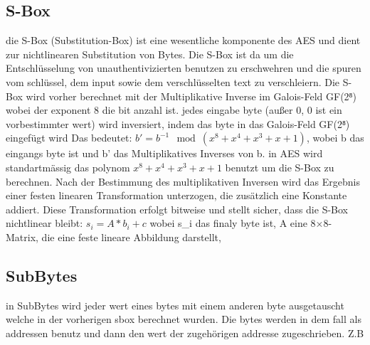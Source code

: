 \subsection{S-Box}
die S-Box (Substitution-Box) ist eine wesentliche komponente des AES und dient zur nichtlinearen Substitution von Bytes. 
Die S-Box ist da um die Entschlüsselung von unauthentivizierten benutzen zu erschwehren und die spuren vom schlüssel, dem 
input sowie dem verschlüsselten text zu verschleiern. Die S-Box wird vorher berechnet mit der Multiplikative Inverse im Galois-Feld GF(2⁸) 
wobei der exponent 8 die bit anzahl ist. jedes eingabe byte (außer 0, 0 ist ein vorbestimmter wert) wird inversiert, indem das byte in das Galois-Feld GF(2⁸) eingefügt wird 
Das bedeutet: $b' = b^{-1} \mod (x^8 + x^4 + x^3 + x + 1)$, wobei b das eingangs byte ist und b' das Multiplikatives Inverses von b. in AES wird standartmässig 
das polynom $x^8 + x^4 + x^3 + x + 1$ benutzt um die S-Box zu berechnen. Nach der Bestimmung des multiplikativen Inversen wird das 
Ergebnis einer festen linearen Transformation unterzogen, die zusätzlich eine Konstante addiert. Diese Transformation erfolgt bitweise und stellt sicher, dass die S-Box 
nichtlinear bleibt: $s_i = A * b_i +c$ wobei s_i das finaly byte ist, A eine 8×8-Matrix, die eine feste lineare Abbildung darstellt,



\subsection{SubBytes}
in SubBytes wird jeder wert eines bytes mit einem anderen byte ausgetauscht welche in der vorherigen sbox berechnet wurden.
 Die bytes werden in dem fall als addressen benutz und dann den wert der zugehörigen addresse zugeschrieben. Z.B \\
 \begin{table}[H]
    
    \caption{Beispiel einer S-Box im AES-Algorithmus}
\end{table}


